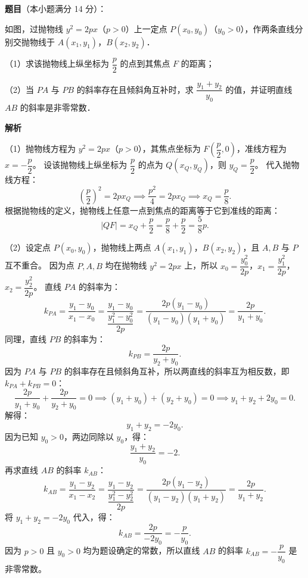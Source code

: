 \begin{answer}

\textbf{题目}（本小题满分 14 分）：

如图，过抛物线 $y^2=2px$（$p>0$）上一定点 $P(x_0, y_0)$（$y_0>0$），作两条直线分别交抛物线于 $A(x_1, y_1)$，$B(x_2, y_2)$．

（1）求该抛物线上纵坐标为 $\dfrac{p}{2}$ 的点到其焦点 $F$ 的距离；

（2）当 $PA$ 与 $PB$ 的斜率存在且倾斜角互补时，求 $\dfrac{y_1+y_2}{y_0}$ 的值，并证明直线 $AB$ 的斜率是非零常数．
\nopagebreak[4]
\begin{center}\end{center}
\nopagebreak[4]
\textbf{解析}

（1）抛物线方程为 $y^2=2px$（$p>0$），其焦点坐标为 $F\left(\dfrac{p}{2}, 0\right)$，准线方程为 $x=-\dfrac{p}{2}$。
设该抛物线上纵坐标为 $\dfrac{p}{2}$ 的点为 $Q(x_Q, y_Q)$，则 $y_Q=\dfrac{p}{2}$。
代入抛物线方程：
\nopagebreak[4]
\[
\left(\frac{p}{2}\right)^2=2px_Q\implies \frac{p^2}{4}=2px_Q\implies x_Q=\frac{p}{8}.
\]
根据抛物线的定义，抛物线上任意一点到焦点的距离等于它到准线的距离：
\nopagebreak[4]
\[
|QF|=x_Q+\frac{p}{2}=\frac{p}{8}+\frac{p}{2}=\frac{5}{8}p.
\]

（2）设定点 $P(x_0, y_0)$，抛物线上两点 $A(x_1, y_1)$，$B(x_2, y_2)$，且 $A, B$ 与 $P$ 互不重合。
因为点 $P, A, B$ 均在抛物线 $y^2=2px$ 上，所以 $x_0=\dfrac{y_0^2}{2p}$，$x_1=\dfrac{y_1^2}{2p}$，$x_2=\dfrac{y_2^2}{2p}$。
直线 $PA$ 的斜率为：
\nopagebreak[4]
\[
k_{PA}=\frac{y_1-y_0}{x_1-x_0}=\frac{y_1-y_0}{\dfrac{y_1^2-y_0^2}{2p}}=\frac{2p(y_1-y_0)}{(y_1-y_0)(y_1+y_0)}=\frac{2p}{y_1+y_0}.
\]
同理，直线 $PB$ 的斜率为：
\nopagebreak[4]
\[
k_{PB}=\frac{2p}{y_2+y_0}.
\]
因为 $PA$ 与 $PB$ 的斜率存在且倾斜角互补，所以两直线的斜率互为相反数，即 $k_{PA}+k_{PB}=0$：
\nopagebreak[4]
\[
\frac{2p}{y_1+y_0}+\frac{2p}{y_2+y_0}=0\implies (y_1+y_0)+(y_2+y_0)=0\implies y_1+y_2+2y_0=0.
\]
解得：
\nopagebreak[4]
\[
y_1+y_2=-2y_0.
\]
因为已知 $y_0>0$，两边同除以 $y_0$，得：
\nopagebreak[4]
\[
\frac{y_1+y_2}{y_0}=-2.
\]
再求直线 $AB$ 的斜率 $k_{AB}$：
\nopagebreak[4]
\[
k_{AB}=\frac{y_1-y_2}{x_1-x_2}=\frac{y_1-y_2}{\dfrac{y_1^2-y_2^2}{2p}}=\frac{2p(y_1-y_2)}{(y_1-y_2)(y_1+y_2)}=\frac{2p}{y_1+y_2}.
\]
将 $y_1+y_2=-2y_0$ 代入，得：
\nopagebreak[4]
\[
k_{AB}=\frac{2p}{-2y_0}=-\frac{p}{y_0}.
\]
因为 $p>0$ 且 $y_0>0$ 均为题设确定的常数，所以直线 $AB$ 的斜率 $k_{AB}=-\dfrac{p}{y_0}$ 是非零常数。


\end{answer}
